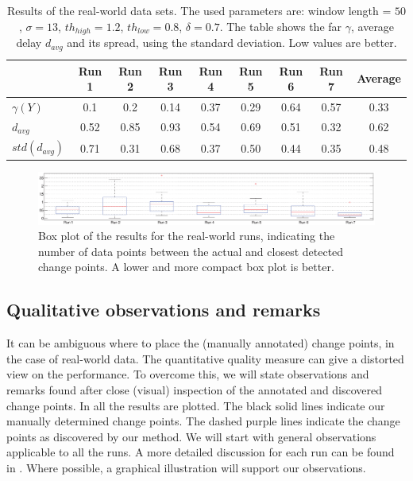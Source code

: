 \begin{table}[H]
  \centering
  \caption[Results real world runs]{Results of the real-world data sets. The used parameters are: window length = $50$, $\sigma = 13$, $th_{high} = 1.2$, $th_{low} = 0.8$, $\delta = 0.7$.
  The table shows the \gls{far} $\gamma$, average delay $d_{avg}$ and its spread, using the standard deviation.
  Low values are better.
  }
  \begin{tabulary}{\textwidth}{|l|c|c|c|c|c|c|c||c|}
     & Run 1 & Run 2 & Run 3 & Run 4 & Run 5 & Run 6 & Run 7 & Average \\
    \hline
    $\gamma(Y)$ & 0.1 & 0.2 & 0.14 & 0.37 & 0.29 & 0.64 & 0.57 & 0.33 \\
    \hline
    $d_{avg}$ & 0.52 & 0.85 & 0.93 & 0.54 & 0.69 & 0.51 & 0.32 & 0.62\\
    \hline
    $std(d_{avg})$ & 0.71 & 0.31 & 0.68 & 0.37 & 0.50 & 0.44 & 0.35 & 0.48 \\
    \hline
  \end{tabulary}
  \label{tab:results_final_real_world}
\end{table}

\begin{figure}[H]
\centering
  \includegraphics[width=1\textwidth]{./Figures/chapter6/data_collection/boxplot_final_runs.eps}
  \caption[Box plot results real-world runs]{Box plot of the results for the real-world runs, indicating the number of data points between the actual and closest detected change points. A lower and more compact box plot is better.}
  \label{fig:boxplot_final_real_world_runs}
\end{figure}

\subsection{Qualitative observations and remarks}\label{subsec:subjective_results}
It can be ambiguous where to place the (manually annotated) change points, in the case of real-world data.
The quantitative quality measure can give a distorted view on the performance.
To overcome this, we will state observations and remarks found after close (visual) inspection of the annotated and discovered change points.
In  all the results are plotted.
The black solid lines indicate our manually determined change points.
The dashed purple lines indicate the change points as discovered by our method.
We will start with general observations applicable to all the runs.
A more detailed discussion for each run can be found in .
Where possible, a graphical illustration will support our observations.

